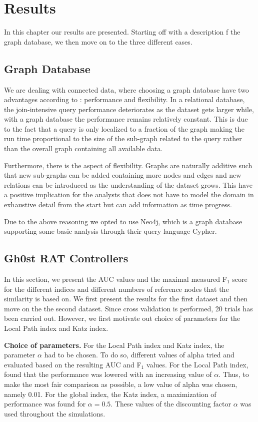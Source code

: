 \chapter{Results}
In this chapter our results are presented. Starting off with a description f the graph database, we then move on to the three different cases. 

\section{Graph Database}
We are dealing with connected data, where choosing a graph database have two advantages according to \citet{robinson2013}: performance and flexibility. In a relational database, the join-intensive query performance deteriorates as the dataset gets larger while, with a graph database the performance remains relatively constant. This is due to the fact that a query is only localized to a fraction of the graph making the run time proportional to the size of the sub-graph related to the query rather than the overall graph containing all available data.

Furthermore, there is the aspect of flexibility. Graphs are naturally additive \cite{robinson2013} such that new sub-graphs can be added containing more nodes and edges and new relations can be introduced as the understanding of the dataset grows. This have a positive implication for the analysts that does not have to model the domain in exhaustive detail from the start but can add information as time progress.

Due to the above reasoning we opted to use Neo4j, which is a graph database supporting some basic analysis through their query language Cypher.

\section{Gh0st RAT Controllers}
In this section, we present the AUC values and the maximal measured F$_1$ score for the different indices and different numbers of reference nodes that the similarity is based on. We first present the results for the first dataset and then move on the the second dataset. Since cross validation is performed, 20 trials has been carried out. However, we first motivate out choice of parameters for the Local Path index and Katz index.

\textbf{Choice of parameters.} For the Local Path index and Katz index,  the parameter $\alpha$ had to be chosen. To do so, different values of alpha  tried and evaluated based on the resulting AUC and F$_1$ values. For the Local Path index, found that the performance was lowered with an increasing value of $\alpha$. Thus, to make the most fair comparison as possible, a low value of alpha was chosen, namely 0.01. For the global index, the Katz index, a maximization of performance was found for $\alpha=0.5$. These values of the discounting factor $\alpha$ was used throughout the simulations. 

